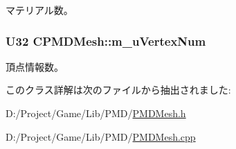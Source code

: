 マテリアル数。 

\hypertarget{class_c_p_m_d_mesh_a4f1ecf35269d6f92bdbb6a65fbcde9c7}{}
\subsubsection[{m\+\_\+u\+Vertex\+Num}]{\setlength{\rightskip}{0pt plus 5cm}U32 C\+P\+M\+D\+Mesh\+::m\+\_\+u\+Vertex\+Num\hspace{0.3cm}{\ttfamily [private]}}\label{class_c_p_m_d_mesh_a4f1ecf35269d6f92bdbb6a65fbcde9c7}


頂点情報数。 



このクラス詳解は次のファイルから抽出されました\+:\begin{DoxyCompactItemize}
\item 
D\+:/\+Project/\+Game/\+Lib/\+P\+M\+D/\hyperlink{_p_m_d_mesh_8h}{P\+M\+D\+Mesh.\+h}\item 
D\+:/\+Project/\+Game/\+Lib/\+P\+M\+D/\hyperlink{_p_m_d_mesh_8cpp}{P\+M\+D\+Mesh.\+cpp}\end{DoxyCompactItemize}
